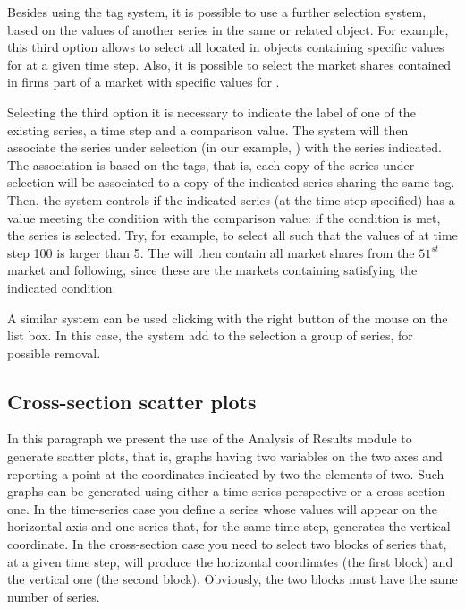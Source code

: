 \documentclass [11pt,a4paper] {book}
\begin{document}
Besides using the tag system, it is possible to use a further selection system, based on the values of another series in the same or related object. For example, this third option allows to select all  located in objects containing specific values for  at a given time step. Also, it is possible to select the market shares contained in firms part of a market with specific values for .

Selecting the third option  it is necessary to indicate the label of one of the existing series, a time step and a comparison value. The system will then associate the series under selection (in our example, ) with the series indicated. The association is based on the tags, that is, each copy of the series under selection will be associated to a copy of the indicated series sharing the same tag. Then, the system controls if the indicated series (at the time step specified) has a value meeting the condition with the comparison value: if the condition is met, the series is selected. Try, for example, to select all  such that the values of  at time step 100 is larger than 5. The  will then contain all market shares from the $51^{st}$ market and following, since these are the markets containing  satisfying the indicated condition.

A similar system can be used clicking with the right button of the mouse on the  list box. In this case, the system add to the selection a group of series, for possible removal.

\subsection{Cross-section scatter plots}

In this paragraph we present the use of the Analysis of Results module to generate scatter plots, that is, graphs having two variables on the two axes and reporting a point at the coordinates indicated by two the elements of two. Such graphs can be generated using either a time series perspective or a cross-section one. In the time-series case you define a series whose values will appear on the horizontal axis and one series that, for the same time step, generates the vertical coordinate. In the cross-section case you need to select two blocks of series that, at a given time step, will produce the horizontal coordinates (the first block) and the vertical one (the second block). Obviously, the two blocks must have the same number of series.
\end{document}
